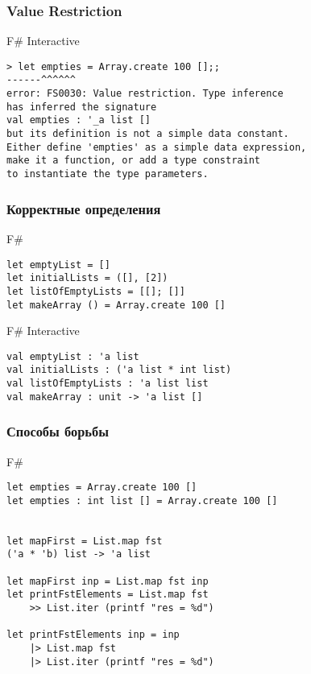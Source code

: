 \documentclass[xetex,mathserif,serif]{beamer}
\begin{document}
	\begin{frame}[fragile]
		\frametitle{Value Restriction}
\begin{alertblock}{F\# Interactive}
\begin{lstlisting}[keywordstyle=\color{black}]
> let empties = Array.create 100 [];;
------^^^^^^
error: FS0030: Value restriction. Type inference 
has inferred the signature 
val empties : '_a list []
but its definition is not a simple data constant. 
Either define 'empties' as a simple data expression, 
make it a function, or add a type constraint 
to instantiate the type parameters.
\end{lstlisting}
\end{alertblock}
\end{frame}

	\begin{frame}[fragile]
		\frametitle{Корректные определения}
		\begin{exampleblock}{F\#}
			\begin{lstlisting}
let emptyList = []
let initialLists = ([], [2])
let listOfEmptyLists = [[]; []]
let makeArray () = Array.create 100 []
\end{lstlisting}
\end{exampleblock}
		
\begin{alertblock}{F\# Interactive}
\begin{lstlisting}[keywordstyle=\color{black}]
val emptyList : 'a list
val initialLists : ('a list * int list)
val listOfEmptyLists : 'a list list
val makeArray : unit -> 'a list []
\end{lstlisting}
\end{alertblock}
\end{frame}

	\begin{frame}[fragile]
		\frametitle{Способы борьбы}
		\begin{exampleblock}{F\#}
			\begin{lstlisting}
let empties = Array.create 100 []
let empties : int list [] = Array.create 100 []


let mapFirst = List.map fst
('a * 'b) list -> 'a list

let mapFirst inp = List.map fst inp
let printFstElements = List.map fst
    >> List.iter (printf "res = %d")

let printFstElements inp = inp
    |> List.map fst
    |> List.iter (printf "res = %d")
\end{lstlisting}
\end{exampleblock}
\end{frame}
\end{document}

